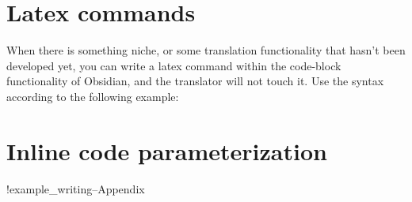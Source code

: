 \documentclass{doc_class_fontsize}{extarticle}
\begin{document}




\section{Latex commands}

When there is something niche, or some translation functionality that hasn't been developed yet, you can write a latex command within the code-block functionality of Obsidian, and the translator will not touch it. Use the syntax according to the following example:





\lipsum[1-4]


\section{Inline code parameterization}

\newpage

\appendix

!example_writing--Appendix

\newpage




\end{document}
